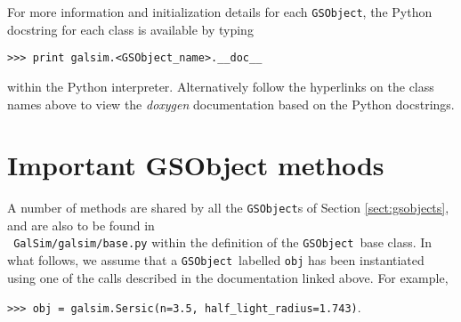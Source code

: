 \documentclass[preprint,11pt]{aastex}
\newcommand{\gsobject}{{\tt GSObject}}
\begin{document}
For more information and initialization details for each \gsobject,
the Python docstring for each class is available by typing

{\tt >>> print galsim.<GSObject\_name>.\_\_doc\_\_}

within the Python interpreter. Alternatively follow the hyperlinks on the class names above to view the
\emph{doxygen} documentation based on the Python docstrings.

\section{Important GSObject methods}\label{sect:gsobjectmethods}
A number of methods are shared by all the \gsobject s of Section
\ref{sect:gsobjects}, and are also to be found in \\ {\tt
  GalSim/galsim/base.py} within the definition of the \gsobject~base
class.  In what follows, we assume that a \gsobject~labelled
\texttt{obj} has been
instantiated using one of the calls described in the documentation
linked above.  For example,

{\tt >>> obj = galsim.Sersic(n=3.5, half\_light\_radius=1.743)}.
\end{document}
